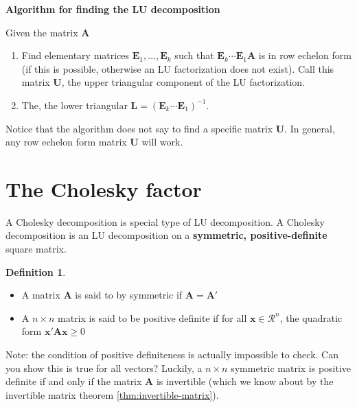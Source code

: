 \documentclass[
]{book}
\theoremstyle{definition}
\newtheorem{definition}{Definition}[chapter]
\theoremstyle{definition}
\theoremstyle{definition}
\theoremstyle{remark}
\begin{document}
\textbf{Algorithm for finding the LU decomposition}

Given the matrix \(\mathbf{A}\)

\begin{enumerate}
\def\labelenumi{\arabic{enumi})}
\item
  Find elementary matrices \(\mathbf{E}_1, \ldots, \mathbf{E}_k\) such that \(\mathbf{E}_k \cdots \mathbf{E}_1 \mathbf{A}\) is in row echelon form (if this is possible, otherwise an LU factorization does not exist). Call this matrix \(\mathbf{U}\), the upper triangular component of the LU factorization.
\item
  The, the lower triangular \(\mathbf{L} = (\mathbf{E}_k \cdots \mathbf{E}_1)^{-1}\).
\end{enumerate}

Notice that the algorithm does not say to find a specific matrix \(\mathbf{U}\). In general, any row echelon form matrix \(\mathbf{U}\) will work.

\hypertarget{the-cholesky-factor}{%
\section{The Cholesky factor}\label{the-cholesky-factor}}

A Cholesky decomposition is special type of LU decomposition. A Cholesky decomposition is an LU decomposition on a \textbf{symmetric, positive-definite} square matrix.

\begin{definition}
\protect\hypertarget{def:unlabeled-div-80}{}\label{def:unlabeled-div-80}

\begin{itemize}
\item
  A matrix \(\mathbf{A}\) is said to by symmetric if \(\mathbf{A} = \mathbf{A}'\)
\item
  A \(n \times n\) matrix is said to be positive definite if for all \(\mathbf{x} \in \mathcal{R}^n\), the quadratic form \(\mathbf{x}' \mathbf{A }\mathbf{x} \geq 0\)
\end{itemize}

\end{definition}

Note: the condition of positive definiteness is actually impossible to check. Can you show this is true for all vectors? Luckily, a \(n \times n\) symmetric matrix is positive definite if and only if the matrix \(\mathbf{A}\) is invertible (which we know about by the invertible matrix theorem \ref{thm:invertible-matrix}).
\end{document}
